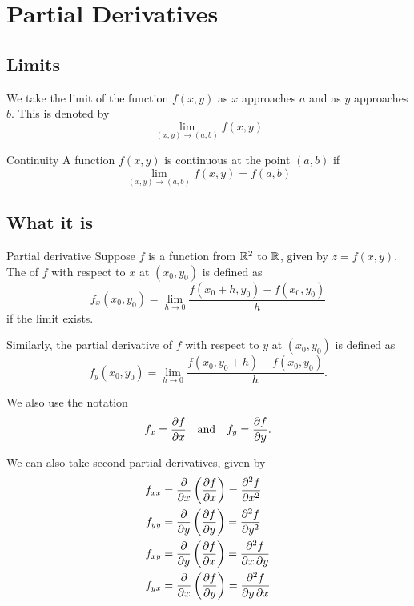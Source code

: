 \section{Partial Derivatives}
\subsection{Limits}
We take the limit of the function $f(x,y)$ as $x$ approaches $a$ and as $y$ approaches $b$. This is denoted by
\[ \lim_{(x,y)\to(a,b)}f(x,y) \]

\begin{defn}{Continuity}{}
A function $f(x,y)$ is continuous at the point $(a,b)$ if
\[ \lim_{(x,y)\to(a,b)} f(x,y) = f(a,b) \]
\end{defn}

\subsection{What it is}
\begin{defn}{Partial derivative}{}
Suppose $f$ is a function from $\mathbb R^2$ to $\mathbb R$, given by $z=f(x,y)$. The  of $f$ with respect to $x$ at $(x_0,y_0)$ is defined as
\begin{equation}
f_x(x_0,y_0) = \lim_{h \to 0}\frac{f(x_0+h,y_0)-f(x_0,y_0)}{h}
\end{equation}
if the limit exists.

Similarly, the partial derivative of $f$ with respect to $y$ at $(x_0,y_0)$ is defined as
\begin{equation}
f_y(x_0,y_0) = \lim_{h \to 0}\frac{f(x_0,y_0+h)-f(x_0,y_0)}{h}.
\end{equation}
\end{defn}

\begin{notation}
We also use the notation
\[ f_x=\pdv{f}{x} \quad \text{and} \quad f_y=\pdv{f}{y}. \]
\end{notation}

\begin{notation}
We can also take second partial derivatives, given by
\[ \begin{split}
f_{xx} &= \pdv{}{x}\left(\pdv{f}{x}\right) = \pdv[order={2}]{f}{x} \\
f_{yy} &= \pdv{}{y}\left(\pdv{f}{y}\right) = \pdv[order={2}]{f}{y} \\
f_{xy} &= \pdv{}{y}\left(\pdv{f}{x}\right) = \pdv{f}{x,y} \\
f_{yx} &= \pdv{}{x}\left(\pdv{f}{y}\right) = \pdv{f}{y,x}
\end{split} \]
\end{notation}

